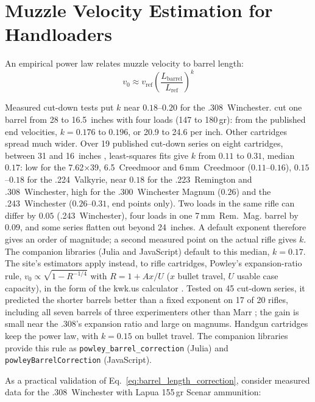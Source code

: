 \documentclass[11pt,twoside,openright]{report}
\begin{document}
\section{Muzzle Velocity Estimation for Handloaders}

An empirical power law relates muzzle velocity to barrel length:
\begin{equation}
  v_0 \approx v_{\mathrm{ref}}\left(\frac{L_{\mathrm{barrel}}}{L_{\mathrm{ref}}}\right)^{k}
  \label{eq:barrel_length_correction}
\end{equation}

Measured cut-down tests put $k$ near $0.18$--$0.20$ for the .308~Winchester. \citet{marr2014barrel} cut one barrel from 28 to 16.5~inches with four loads (147 to 180\,gr): from the published end velocities, $k = 0.176$ to $0.196$, or \SI{20.9}{\fps} to \SI{24.6}{\fps} per inch. Other cartridges spread much wider. Over 19 published cut-down series on eight cartridges, between 31 and 16~inches \citep{marrBarrelSeries}, least-squares fits give $k$ from $0.11$ to $0.31$, median $0.17$: low for the 7.62$\times$39, 6.5~Creedmoor and 6\,mm~Creedmoor ($0.11$--$0.16$), $0.15$--$0.18$ for the .224~Valkyrie, near $0.18$ for the .223~Remington and .308~Winchester, high for the .300~Winchester Magnum ($0.26$) and the .243~Winchester ($0.26$--$0.31$, end points only). Two loads in the same rifle can differ by $0.05$ (.243~Winchester), four loads in one 7\,mm~Rem.~Mag. barrel by $0.09$, and some series flatten out beyond 24~inches. A default exponent therefore gives an order of magnitude; a second measured point on the actual rifle gives $k$. The companion libraries (Julia and JavaScript) default to this median, $k = 0.17$. The site's estimators apply instead, to rifle cartridges, Powley's expansion-ratio rule, $v_0 \propto \sqrt{1 - R^{-1/4}}$ with $R = 1 + A x / U$ ($x$ bullet travel, $U$ usable case capacity), in the form of the kwk.us calculator \citep{kwkPowley}. Tested on 45 cut-down series, it predicted the shorter barrels better than a fixed exponent on 17 of 20 rifles, including all seven barrels of three experimenters other than Marr \citep{hodgdon2026barrel,eagleman2023prc,accurateshooter2011barrel}; the gain is small near the .308's expansion ratio and large on magnums. Handgun cartridges keep the power law, with $k = 0.15$ on bullet travel. The companion libraries provide this rule as \texttt{powley\_barrel\_correction} (Julia) and \texttt{powleyBarrelCorrection} (JavaScript).

As a practical validation of Eq.~\eqref{eq:barrel_length_correction}, consider measured data for the .308~Winchester with Lapua 155\,gr Scenar ammunition:
\end{document}
